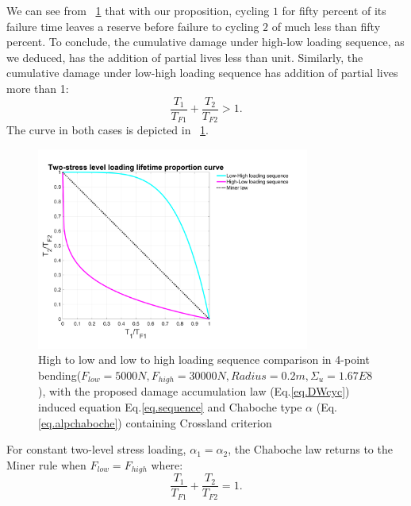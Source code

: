 \documentclass[3p,times,procedia,number]{elsarticle}
\newcommand{\figref}[1]{\figurename~\ref{#1}}
\begin{document}
We can see from \figref{fig.sequence} that with our proposition, cycling $1$ for fifty percent of its failure time leaves a reserve before failure to cycling $2$ of much less than fifty percent. To conclude, the cumulative damage under high-low loading sequence, as we deduced, has the addition of partial lives less than unit. Similarly, the cumulative damage under low-high loading sequence has addition of partial lives more than 1:
$$\frac{T_1}{T_{F1}}+\frac{T_2}{T_{F2}}>1.$$
The curve in both cases is depicted in \figref{fig.sequence}.
\begin{figure}[!h]
\centering
\includegraphics[width=0.8\textwidth]{figures//sequence.png} 
\caption{High to low and low to high loading sequence comparison in 4-point bending($F_{low}=5000 N, F_{high}=30000 N, Radius=0.2m, \Sigma_u=1.67E8$), with the proposed damage accumulation law (Eq.\eqref{eq.DWcyc}) induced equation Eq.\eqref{eq.sequence} and Chaboche type $\alpha$ (Eq.\eqref{eq.alpchaboche}) containing Crossland criterion}
\label{fig.sequence}
\end{figure}
For constant two-level stress loading, $\alpha_1=\alpha_2$, the Chaboche law returns to the Miner rule when $F_{low}=F_{high}$ where:
$$\frac{T_1}{T_{F1}}+\frac{T_2}{T_{F2}}=1.$$

\newpage
\end{document}
